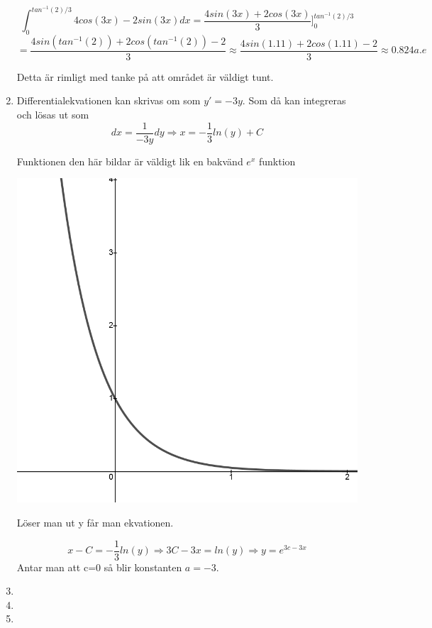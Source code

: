 \documentclass[a4paper,12pt]{article}
\begin{document}
\begin{enumerate}
    $$\int_0^{tan^{-1}(2)/3}4cos(3x)-2sin(3x)dx=\frac{4sin(3x)+2cos(3x)}{3}]^{tan^{-1}(2)/3}_0$$
    $$=\frac{4sin(tan^{-1}(2))+2cos(tan^{-1}(2))-2}{3}\approx \frac{4sin(1.11)+2cos(1.11)-2}{3}\approx 0.824 a.e$$

    Detta är rimligt med tanke på att området är väldigt tunt.

    \item Differentialekvationen kan skrivas om som $y'=-3y$. Som då kan integreras och lösas ut som
    $${dx}=\frac{1}{-3y}dy\Rightarrow x=-\frac{1}{3}ln(y)+C$$

    Funktionen den här bildar är väldigt lik en bakvänd $e^x$ funktion
    \begin{center}
        \includegraphics[scale=0.4]{Figur 5.png}
    \end{center}

    Löser man ut y får man ekvationen.

    $$x-C=-\frac{1}{3}ln(y)\Rightarrow 3C-3x=ln(y)\Rightarrow y=e^{3c-3x}$$
    Antar man att c=0 så blir konstanten $a=-3$.

    \item 

    \item 
    
    \item 
    

\end{enumerate}
\end{document}
